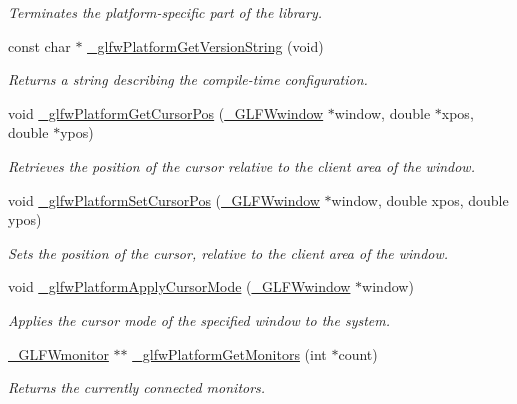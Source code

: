 \begin{DoxyCompactItemize}
\begin{DoxyCompactList}\small\item\em Terminates the platform-\/specific part of the library. \end{DoxyCompactList}\item 
const char $\ast$ \hyperlink{group__platform_ga4cfd5b7d5ee93f3953056de86efc254c}{\+\_\+glfw\+Platform\+Get\+Version\+String} (void)
\begin{DoxyCompactList}\small\item\em Returns a string describing the compile-\/time configuration. \end{DoxyCompactList}\item 
void \hyperlink{group__platform_gae5cf9708c6bae74f899eb62d29b7908a}{\+\_\+glfw\+Platform\+Get\+Cursor\+Pos} (\hyperlink{struct__GLFWwindow}{\+\_\+\+G\+L\+F\+Wwindow} $\ast$window, double $\ast$xpos, double $\ast$ypos)
\begin{DoxyCompactList}\small\item\em Retrieves the position of the cursor relative to the client area of the window. \end{DoxyCompactList}\item 
void \hyperlink{group__platform_ga710177640b2ec4ca911527ff47348d18}{\+\_\+glfw\+Platform\+Set\+Cursor\+Pos} (\hyperlink{struct__GLFWwindow}{\+\_\+\+G\+L\+F\+Wwindow} $\ast$window, double xpos, double ypos)
\begin{DoxyCompactList}\small\item\em Sets the position of the cursor, relative to the client area of the window. \end{DoxyCompactList}\item 
void \hyperlink{group__platform_ga21c2ffaf0606d63c62b99e1326befe79}{\+\_\+glfw\+Platform\+Apply\+Cursor\+Mode} (\hyperlink{struct__GLFWwindow}{\+\_\+\+G\+L\+F\+Wwindow} $\ast$window)
\begin{DoxyCompactList}\small\item\em Applies the cursor mode of the specified window to the system. \end{DoxyCompactList}\item 
\hyperlink{struct__GLFWmonitor}{\+\_\+\+G\+L\+F\+Wmonitor} $\ast$$\ast$ \hyperlink{group__platform_ga13e1120bde080e163979e037486ffa87}{\+\_\+glfw\+Platform\+Get\+Monitors} (int $\ast$count)
\begin{DoxyCompactList}\small\item\em Returns the currently connected monitors. \end{DoxyCompactList}\item 
$$
\end{DoxyCompactItemize}
